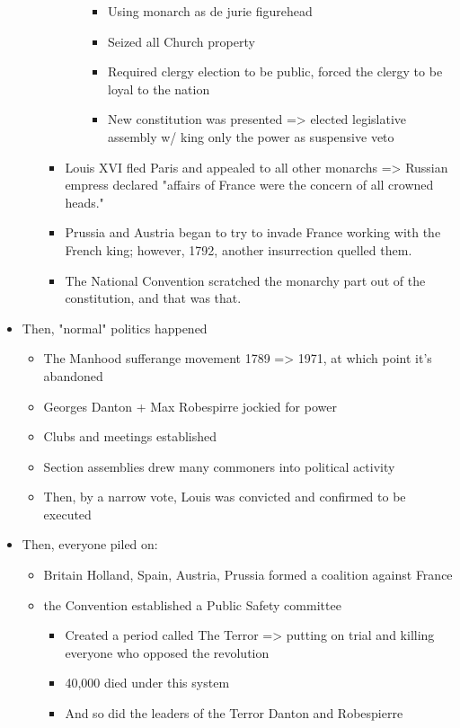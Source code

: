\documentclass[letterpaper]{article}
\begin{document}
\begin{itemize}
\begin{itemize}
\begin{itemize}
\begin{itemize}
\begin{itemize}
\item Using monarch as de jurie figurehead
\item Seized all Church property
\item Required clergy election to be public, forced the clergy to be
loyal to the nation
\item New constitution was presented => elected legislative assembly
w/ king only the power as suspensive veto
\end{itemize}
\end{itemize}

\item Louis XVI fled Paris and appealed to all other monarchs => Russian
empress declared "affairs of France were the concern of all
crowned heads."
\item Prussia and Austria began to try to invade France working with the
French king; however, 1792, another insurrection quelled them.
\item The National Convention scratched the monarchy part out of the
constitution, and that was that.
\end{itemize}
\end{itemize}

\item Then, "normal" politics happened

\begin{itemize}
\item The Manhood sufferange movement 1789 => 1971, at which point it's
abandoned
\item Georges Danton + Max Robespirre jockied for power
\item Clubs and meetings established
\item Section assemblies drew many commoners into political activity
\item Then, by a narrow vote, Louis was convicted and confirmed to be
executed
\end{itemize}

\item Then, everyone piled on:

\begin{itemize}
\item Britain Holland, Spain, Austria, Prussia formed a coalition against
France
\item the Convention established a Public Safety committee

\begin{itemize}
\item Created a period called The Terror => putting on trial and killing
everyone who opposed the revolution
\item 40,000 died under this system
\item And so did the leaders of the Terror Danton and Robespierre
\end{itemize}


\end{itemize}
\end{itemize}
\end{document}
